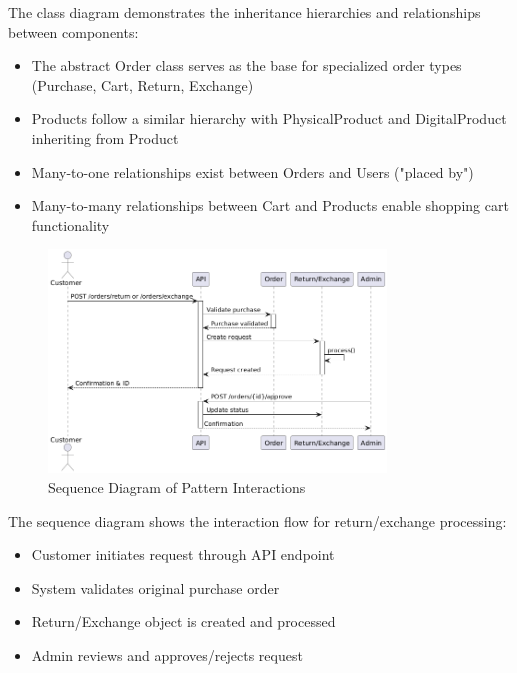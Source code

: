 \documentclass[12pt,a4paper]{article}
\begin{document}
The class diagram demonstrates the inheritance hierarchies and relationships between components:
\begin{itemize}
    \item The abstract Order class serves as the base for specialized order types (Purchase, Cart, Return, Exchange)
    \item Products follow a similar hierarchy with PhysicalProduct and DigitalProduct inheriting from Product
    \item Many-to-one relationships exist between Orders and Users ("placed by")
    \item Many-to-many relationships between Cart and Products enable shopping cart functionality
\end{itemize}

\begin{figure}[H]
    \centering
    \includegraphics[width=0.8\textwidth]{docs/diagrams/sequence_diagram.png}
    \caption{Sequence Diagram of Pattern Interactions}
\end{figure}

The sequence diagram shows the interaction flow for return/exchange processing:
\begin{itemize}
    \item Customer initiates request through API endpoint
    \item System validates original purchase order
    \item Return/Exchange object is created and processed
    \item Admin reviews and approves/rejects request
\end{itemize}
\end{document}
